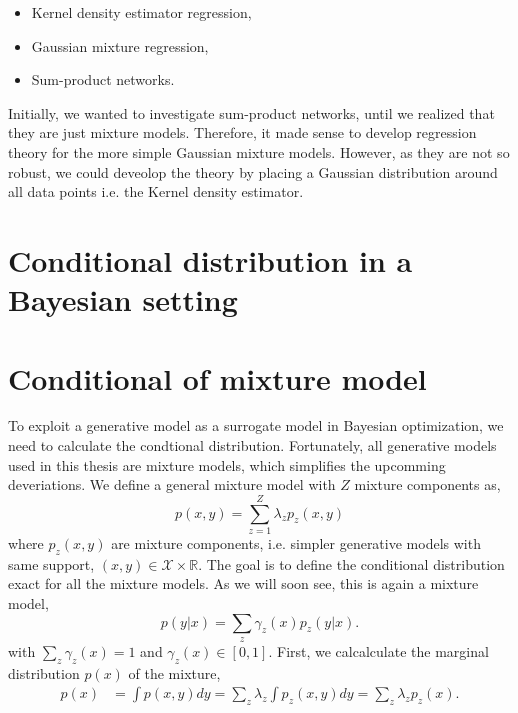 \begin{itemize}[noitemsep]
     \item Kernel density estimator regression,
     \item Gaussian mixture regression,
     \item Sum-product networks.
 \end{itemize}

 \begin{note2}[]
    Initially, we wanted to investigate sum-product networks, until we realized that they are just
    mixture models. Therefore, it made sense to develop regression theory for the more simple
    Gaussian mixture models. However, as they are not so robust, we could deveolop the theory by
    placing a Gaussian distribution around all data points i.e. the Kernel density estimator. 
 \end{note2}



 \section{Conditional distribution in a Bayesian setting}\label{mixture_include_prior}
 




\section{Conditional of mixture model}\label{Conditional_mixture}
To exploit a generative model as a surrogate model in Bayesian optimization, we need to calculate
the condtional distribution. Fortunately, all generative models used in this thesis are mixture
models, which simplifies the upcomming deveriations. We define a general mixture model with $Z$ mixture
components as, 
$$p(x,y) = \sum_{z=1}^Z \lambda_z p_z(x,y)$$ where $p_z(x,y)$ are mixture components, i.e. simpler
generative models with same support, $(x,y) \in \mathcal{X}\times \mathbb{R}$. 
The goal is to define
the conditional distribution exact for all the mixture models. As we will soon see, this is again a
mixture model, 
$$p(y|x) = \sum_z \gamma_z(x) p_z(y|x).$$ with $\sum_z \gamma_z(x) = 1$ and $\gamma_z(x) \in [0,1]$.
First, we calcalculate the marginal distribution $p(x)$ of the mixture, 
\begin{align*}
    p(x) &= \int p(x,y) dy =\sum_{z} \lambda_z \int p_z(x,y) dy =\sum_{z} \lambda_z p_z(x).
\end{align*}

